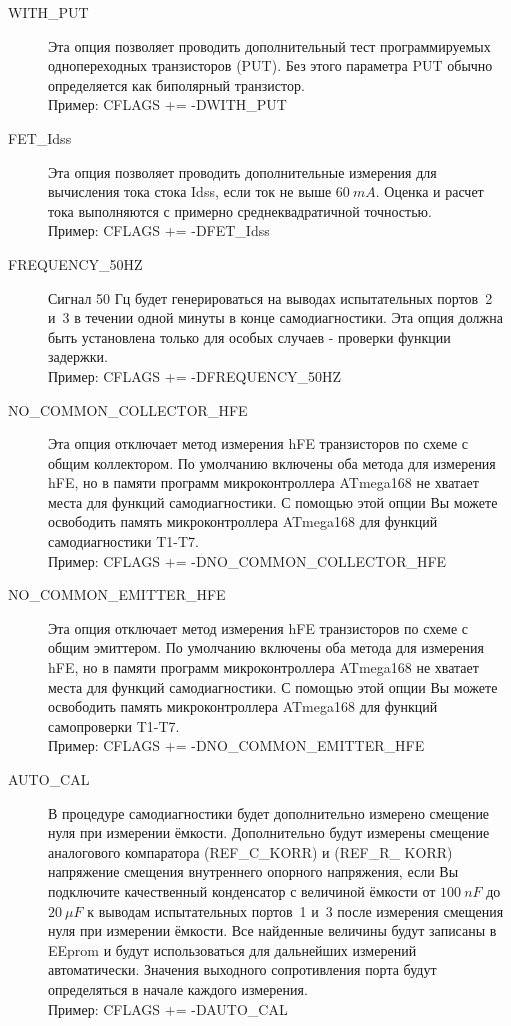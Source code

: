\begin{description}
  \item[WITH\_PUT] Эта опция позволяет проводить дополнительный тест программируемых однопереходных
транзисторов (PUT). Без этого параметра PUT обычно определяется как биполярный транзистор.\\
Пример: CFLAGS += -DWITH\_PUT

  \item[FET\_Idss]
Эта опция позволяет проводить дополнительные измерения для вычисления тока стока Idss, если ток
не выше \(60~mA\). Оценка и расчет тока выполняются с примерно среднеквадратичной точностью.\\
Пример: CFLAGS += -DFET\_Idss

  \item[FREQUENCY\_50HZ] Сигнал 50 Гц будет генерироваться на выводах испытательных портов~2 и~3 в течении 
одной минуты в конце самодиагностики.
Эта опция должна быть установлена только для особых случаев - проверки функции задержки.\\
Пример: CFLAGS += -DFREQUENCY\_50HZ

  \item[NO\_COMMON\_COLLECTOR\_HFE] Эта опция отключает метод измерения hFE транзисторов по схеме с общим 
коллектором. По умолчанию включены оба метода для измерения hFE, но в памяти программ микроконтроллера ATmega168 
не хватает места для функций самодиагностики. С помощью этой опции Вы можете освободить память микроконтроллера 
ATmega168 для функций самодиагностики T1-T7.\\
Пример: CFLAGS += -DNO\_COMMON\_COLLECTOR\_HFE

  \item[NO\_COMMON\_EMITTER\_HFE] Эта опция отключает метод измерения hFE транзисторов по схеме с общим эмиттером. 
По умолчанию включены оба метода для измерения hFE, но в памяти программ микроконтроллера ATmega168 не хватает 
места для функций самодиагностики. С помощью этой опции Вы можете освободить память микроконтроллера ATmega168 для 
функций самопроверки T1-T7.\\
Пример: CFLAGS += -DNO\_COMMON\_EMITTER\_HFE

  \item[AUTO\_CAL] В процедуре самодиагностики будет дополнительно измерено смещение нуля при измерении ёмкости. 
Дополнительно будут измерены смещение аналогового компаратора (REF\_C\_KORR) и (REF\_R\_ KORR) напряжение смещения 
внутреннего опорного напряжения, если Вы подключите качественный конденсатор с величиной ёмкости от \(100~nF\) 
до \(20~\mu F\) к выводам испытательных портов~1 и~3 после измерения смещения нуля при измерении ёмкости. Все 
найденные величины будут записаны в EEprom и будут использоваться для дальнейших измерений автоматически. Значения 
выходного сопротивления порта будут определяться в начале каждого измерения.\\
Пример: CFLAGS += -DAUTO\_CAL


\end{description}

